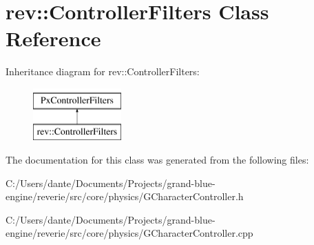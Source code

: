 \hypertarget{classrev_1_1_controller_filters}{}\section{rev\+::Controller\+Filters Class Reference}
\label{classrev_1_1_controller_filters}
Inheritance diagram for rev\+::Controller\+Filters\+:\begin{figure}[H]
\begin{center}
\leavevmode
\includegraphics[height=2.000000cm]{classrev_1_1_controller_filters}
\end{center}
\end{figure}


The documentation for this class was generated from the following files\+:\begin{DoxyCompactItemize}
\item 
C\+:/\+Users/dante/\+Documents/\+Projects/grand-\/blue-\/engine/reverie/src/core/physics/G\+Character\+Controller.\+h\item 
C\+:/\+Users/dante/\+Documents/\+Projects/grand-\/blue-\/engine/reverie/src/core/physics/G\+Character\+Controller.\+cpp\end{DoxyCompactItemize}
